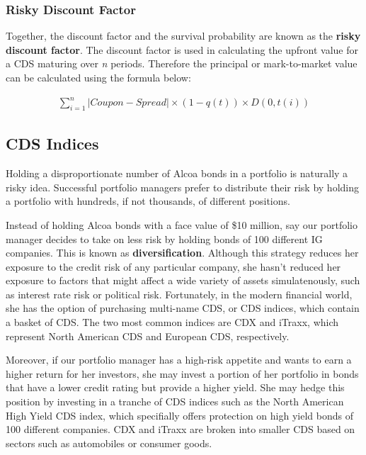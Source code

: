 \documentclass{jss}
\begin{document}
\subsubsection{Risky Discount Factor}

Together, the discount factor and the survival probability are known as the \textbf{risky discount factor}. The discount factor is used in calculating the upfront value for a CDS maturing over \textit{n} periods. Therefore the principal or mark-to-market value can be calculated using the formula below:

\begin{equation}
 \begin{aligned}
   \displaystyle\sum_{i=1}^{n}|Coupon - Spread| \times (1-q(t)) \times D(0, t(i))
    \end{aligned}
\end{equation}

\subsection{CDS Indices}
\label{sec:CDSIndices}

Holding a disproportionate number of Alcoa bonds in a portfolio is naturally a risky idea. Successful portfolio managers prefer to distribute their risk by holding a portfolio with hundreds, if not thousands, of different positions. 

Instead of holding Alcoa bonds with a face value of \$10 million, say our portfolio manager decides to take on less risk by holding bonds of 100 different IG companies. This is known as \textbf{diversification}. Although this strategy reduces her exposure to the credit risk of any particular company, she hasn't reduced her exposure to factors that might affect a wide variety of assets simulatenously, such as interest rate risk or political risk. Fortunately, in the modern financial world, she has the option of purchasing multi-name CDS, or CDS indices, which contain a basket of CDS. The two most common indices are CDX and iTraxx, which represent North American CDS and European CDS, respectively.
 
Moreover, if our portfolio manager has a high-risk appetite and wants to earn a higher return for her investors, she may invest a portion of her portfolio in bonds that have a lower credit rating but provide a higher yield. She may hedge this position by investing in a tranche of CDS indices such as the North American High Yield CDS index, which specifially offers protection on high yield bonds of 100 different companies. CDX and iTraxx are broken into smaller CDS based on sectors such as automobiles or consumer goods.
\end{document}
